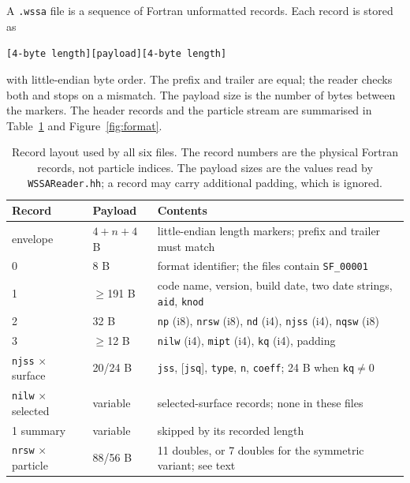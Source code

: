 \documentclass[11pt,a4paper]{article}
\begin{document}
A \texttt{.wssa} file is a sequence of Fortran unformatted records.  Each record
is stored as
\begin{center}
\texttt{[4-byte length][payload][4-byte length]}
\end{center}
with little-endian byte order.  The prefix and trailer are equal; the reader
checks both and stops on a mismatch.  The payload size is the number of bytes
between the markers.  The header records and the particle stream are summarised
in Table~\ref{tab:format} and Figure~\ref{fig:format}.

\begin{table}[t]
\centering
\caption{Record layout used by all six files.  The record numbers are the
physical Fortran records, not particle indices.  The payload sizes are the
values read by \texttt{WSSAReader.hh}; a record may carry additional padding,
which is ignored.}
\label{tab:format}
\footnotesize
\begin{tabular}{@{}l l p{9.7cm}@{}}
\toprule
Record & Payload & Contents \\
\midrule
envelope & $4+n+4$ B & little-endian length markers; prefix and trailer must match \\
0 & 8 B & format identifier; the files contain \texttt{SF\_00001} \\
1 & $\ge$191 B & code name, version, build date, two date strings, \texttt{aid}, \texttt{knod} \\
2 & 32 B & \texttt{np} (i8), \texttt{nrsw} (i8), \texttt{nd} (i4), \texttt{njss} (i4), \texttt{nqsw} (i8) \\
3 & $\ge$12 B & \texttt{nilw} (i4), \texttt{mipt} (i4), \texttt{kq} (i4), padding \\
\texttt{njss} $\times$ surface & 20/24 B & \texttt{jss}, [\texttt{jsq}], \texttt{type}, \texttt{n}, \texttt{coeff}; 24 B when \texttt{kq}$\neq$0 \\
\texttt{nilw} $\times$ selected & variable & selected-surface records; none in these files \\
1 summary & variable & skipped by its recorded length \\
\texttt{nrsw} $\times$ particle & 88/56 B & 11 doubles, or 7 doubles for the symmetric variant; see text \\
\bottomrule
\end{tabular}
\end{table}
\end{document}
